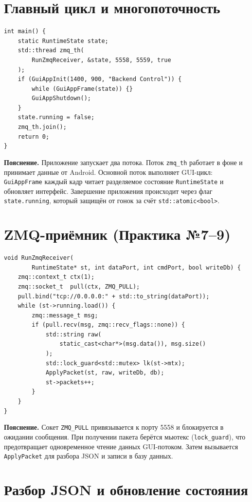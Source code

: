 \documentclass[a4paper,14pt,oneside,openany]{memoir}
\begin{document}
\section{Главный цикл и многопоточность}

\begin{lstlisting}[language=CppSeventeen, caption={src/main.cpp}]
int main() {
    static RuntimeState state;
    std::thread zmq_th(
        RunZmqReceiver, &state, 5558, 5559, true
    );
    if (GuiAppInit(1400, 900, "Backend Control")) {
        while (GuiAppFrame(state)) {}
        GuiAppShutdown();
    }
    state.running = false;
    zmq_th.join();
    return 0;
}
\end{lstlisting}

\textbf{Пояснение.} Приложение запускает два потока. Поток
\texttt{zmq\_th} работает в фоне и принимает данные от Android. Основной
поток выполняет GUI-цикл: \texttt{GuiAppFrame} каждый кадр читает
разделяемое состояние \texttt{RuntimeState} и обновляет интерфейс.
Завершение приложения происходит через флаг \texttt{state.running},
который защищён от гонок за счёт \texttt{std::atomic<bool>}.

\section{ZMQ-приёмник (Практика №7--9)}

\begin{lstlisting}[language=CppSeventeen,
    caption={src/net/zmq\_receiver.cpp (фрагмент)}]
void RunZmqReceiver(
        RuntimeState* st, int dataPort, int cmdPort, bool writeDb) {
    zmq::context_t ctx(1);
    zmq::socket_t  pull(ctx, ZMQ_PULL);
    pull.bind("tcp://0.0.0.0:" + std::to_string(dataPort));
    while (st->running.load()) {
        zmq::message_t msg;
        if (pull.recv(msg, zmq::recv_flags::none)) {
            std::string raw(
                static_cast<char*>(msg.data()), msg.size()
            );
            std::lock_guard<std::mutex> lk(st->mtx);
            ApplyPacket(st, raw, writeDb, db);
            st->packets++;
        }
    }
}
\end{lstlisting}

\textbf{Пояснение.} Сокет \texttt{ZMQ\_PULL} привязывается к порту 5558
и блокируется в ожидании сообщения. При получении пакета берётся мьютекс
(\texttt{lock\_guard}), что предотвращает одновременное чтение данных
GUI-потоком. Затем вызывается \texttt{ApplyPacket} для разбора JSON и
записи в базу данных.

\section{Разбор JSON и обновление состояния}
\end{document}
